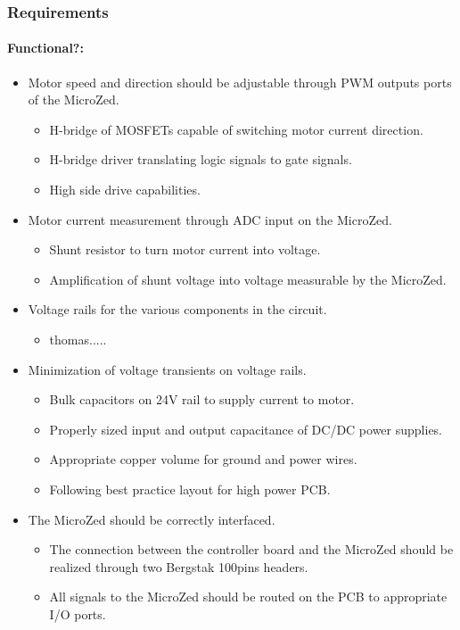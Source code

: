 \subsubsection{Requirements}


\paragraph{Functional?:}
\begin{itemize}
	\item Motor speed and direction should be adjustable through PWM outputs ports of the MicroZed.
	\begin{itemize}
		\item H-bridge of MOSFETs capable of switching motor current direction.
		\item H-bridge driver translating logic signals to gate signals.
		\item High side drive capabilities.
	\end{itemize}

	\item Motor current measurement through ADC input on the MicroZed.
	\begin{itemize}
		\item Shunt resistor to turn motor current into voltage.
		\item Amplification of shunt voltage into voltage measurable by the MicroZed. 
	\end{itemize}

	\item Voltage rails for the various components in the circuit.
	\begin{itemize}
		\item thomas.....
	\end{itemize}

	\item Minimization of voltage transients on voltage rails.
	\begin{itemize}
		\item Bulk capacitors on 24V rail to supply current to motor.
		\item Properly sized input and output capacitance of DC/DC power supplies.
		\item Appropriate copper volume for ground and power wires.
		\item Following best practice layout for high power PCB. 
	\end{itemize}

	\item The MicroZed should be correctly interfaced.
	\begin{itemize}
		\item The connection between the controller board and the MicroZed should be realized through two Bergstak 100pins headers.
		\item All signals to the MicroZed should be routed on the PCB to appropriate I/O ports.
	\end{itemize}
	

\end{itemize}
